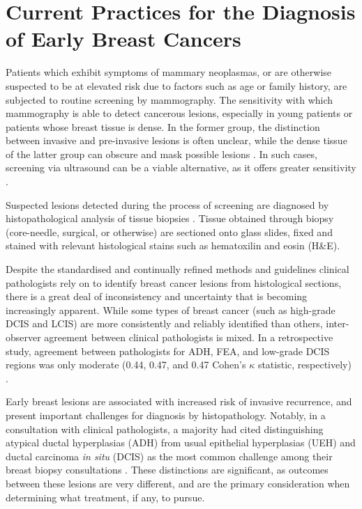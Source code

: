 \section{Current Practices for the Diagnosis of Early Breast Cancers}
Patients which exhibit symptoms of mammary neoplasmas, or are otherwise suspected to be at elevated risk due to factors such as age or family history, are subjected to routine screening by mammography. The sensitivity with which mammography is able to detect cancerous lesions, especially in young patients or patients whose breast tissue is dense. In the former group, the distinction between invasive and pre-invasive lesions is often unclear, while the dense tissue of the latter group can obscure and mask possible lesions \citep{ayvaci2014}. In such cases, screening via ultrasound can be a viable alternative, as it offers greater sensitivity \citep{nothacker2009}.

Suspected lesions detected during the process of screening are diagnosed by histopathological analysis of tissue biopsies \citep{nccn}. Tissue obtained through biopsy (core-needle, surgical, or otherwise) are sectioned onto glass slides, fixed and stained with relevant histological stains such as hematoxilin and eosin (H\&E).

Despite the standardised and continually refined methods and guidelines clinical pathologists rely on to identify breast cancer lesions from histological sections, there is a great deal of inconsistency and uncertainty that is becoming increasingly apparent. While some types of breast cancer (such as high-grade DCIS and LCIS) are more consistently and reliably identified than others, inter-observer agreement between clinical pathologists is mixed. In a retrospective study, agreement between pathologists for ADH, FEA, and low-grade DCIS regions was only moderate (0.44, 0.47, and 0.47 Cohen's $\kappa$ statistic, respectively) \citep{gomes2014}.\par

Early breast lesions are associated with increased risk of invasive recurrence, and present important challenges for diagnosis by histopathology. Notably, in a consultation with clinical pathologists, a majority had cited distinguishing atypical ductal hyperplasias (ADH) from usual epithelial hyperplasias (UEH) and ductal carcinoma \textit{in situ} (DCIS) as the most common challenge among their breast biopsy consultations \citep{putti2005}. These distinctions are significant, as outcomes between these lesions are very different, and are the primary consideration when determining what treatment, if any, to pursue.\par

